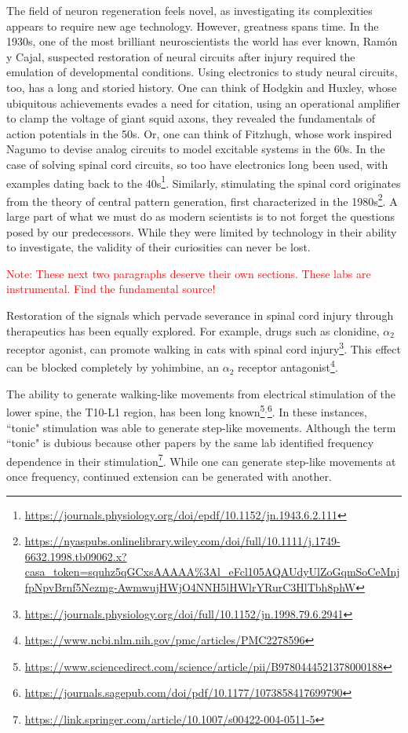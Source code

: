 The field of neuron regeneration feels novel, as investigating its complexities appears to require new age technology. However, greatness spans time. In the 1930s, one of the most brilliant neuroscientists the world has ever known, Ramón y Cajal, suspected restoration of neural circuits after injury required the emulation of developmental conditions. Using electronics to study neural circuits, too, has a long and storied history. One can think of Hodgkin and Huxley, whose ubiquitous achievements evades a need for citation, using an operational amplifier to clamp the voltage of giant squid axons, they revealed the fundamentals of action potentials in the 50s. Or, one can think of Fitzhugh, whose work inspired Nagumo to devise analog circuits to model excitable systems in the 60s. In the case of solving spinal cord circuits, so too have electronics long been used, with examples dating back to the 40s\footnote{\url{https://journals.physiology.org/doi/epdf/10.1152/jn.1943.6.2.111}}. Similarly, stimulating the spinal cord originates from the theory of central pattern generation, first characterized in the 1980s\footnote{\url{https://nyaspubs.onlinelibrary.wiley.com/doi/full/10.1111/j.1749-6632.1998.tb09062.x?casa_token=squhz5qGCxsAAAAA\%3Al_eFcl105AQAUdyUlZoGqmSoCeMnjfpNpvBrnf5Nezmg-AwmwujHWjO4NNH5lHWlrYRurC3HlTbh8phW}}. A large part of what we must do as modern scientists is to not forget the questions posed by our predecessors. While they were limited by technology in their ability to investigate, the validity of their curiosities can never be lost.\newline



\textcolor{red}{Note: These next two paragraphs deserve their own sections. These labs are instrumental. Find the fundamental source!}

Restoration of the signals which pervade severance in spinal cord injury through therapeutics has been equally explored. For example, drugs such as clonidine, $\alpha_2$ receptor agonist, can promote walking in cats with spinal cord injury\footnote{\url{https://journals.physiology.org/doi/full/10.1152/jn.1998.79.6.2941}}. This effect can be blocked completely by yohimbine, an $\alpha_2$ receptor antagonist\footnote{\url{https://www.ncbi.nlm.nih.gov/pmc/articles/PMC2278596}}.\newline

The ability to generate walking-like movements from electrical stimulation of the lower spine, the T10-L1 region, has been long known\footnote{\url{https://www.sciencedirect.com/science/article/pii/B9780444521378000188}}$^,$\footnote{\url{https://journals.sagepub.com/doi/pdf/10.1177/1073858417699790}}. In these instances, ``tonic" stimulation was able to generate step-like movements. Although the term ``tonic" is dubious because other papers by the same lab identified frequency dependence in their stimulation\footnote{\url{https://link.springer.com/article/10.1007/s00422-004-0511-5}}. While one can generate step-like movements at once frequency, continued extension can be generated with another. 

